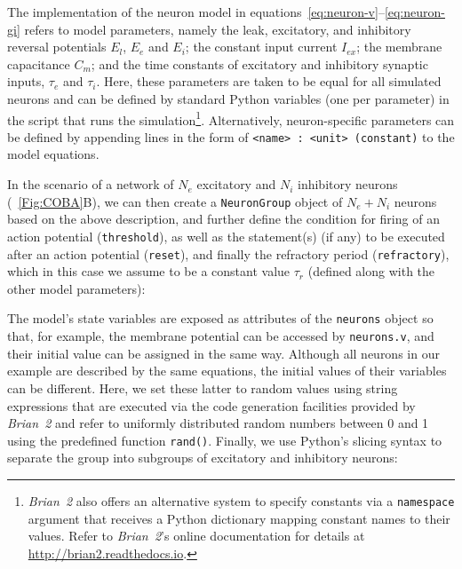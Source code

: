 \documentclass[a4paper, 11pt]{article}
\newcommand{\brian}{\emph{Brian~2}\xspace}
\newcommand*{\figref}[1]{\figurename~\ref{#1}}
\begin{document}
The implementation of the neuron model in equations~\ref{eq:neuron-v}--\ref{eq:neuron-gi} refers to model parameters, namely the leak, excitatory, and inhibitory reversal potentials $E_l$, $E_e$ and $E_i$; the constant input current $I_{ex}$; the membrane capacitance $C_m$; and the time constants of excitatory and inhibitory synaptic inputs, $\tau_e$ and $\tau_i$.
Here, these parameters are taken to be equal for all simulated neurons and can be defined by standard Python variables (one per parameter) in the script that runs the simulation\footnote{\brian also offers an alternative system to specify constants via a \lstinline|namespace| argument that receives a Python dictionary mapping constant names to their values. Refer to \brian's online documentation for details at \href{http://brian2.readthedocs.org}{http://brian2.readthedocs.io}.}.
Alternatively, neuron-specific parameters can be defined by appending lines in the form of \lstinline|<name> : <unit> (constant)| to the model equations.

In the scenario of a network of $N_e$ excitatory and $N_i$ inhibitory neurons (\figref{Fig:COBA}B), we can then create a \lstinline|NeuronGroup| object of $N_e + N_i$ neurons based on the above description, and further define the condition for firing of an action potential (\lstinline|threshold|), as well as the statement(s) (if any) to be executed after an action potential (\lstinline|reset|), and finally the refractory period (\lstinline|refractory|), which in this case we assume to be a constant value $\tau_r$ (defined along with the other model parameters):

The model's state variables are exposed as attributes of the \lstinline|neurons| object so that, for example, the membrane potential can be accessed by \lstinline|neurons.v|, and their initial value can be assigned in the same way.
Although all neurons in our example are described by the same equations, the initial values of their variables can be different. Here, we set these latter to random values using string expressions that are executed via the code generation facilities provided by \brian \citep{Stimberg2014} and refer to uniformly distributed random numbers between 0 and 1 using the predefined function \lstinline|rand()|.
Finally, we use Python's slicing syntax to separate the group into subgroups of excitatory and inhibitory neurons:

\end{document}
